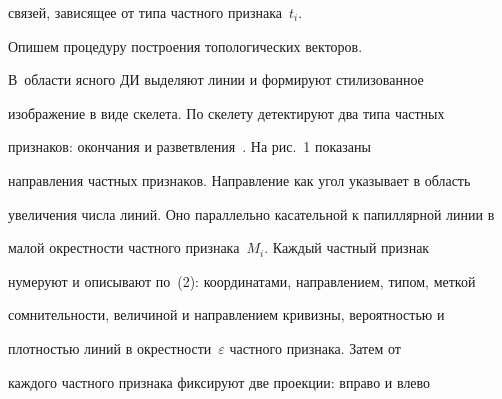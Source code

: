 связей, зависящее от типа частного признака~$t_i$.





  Опишем процедуру построения топологических векторов.


  


  В~области ясного ДИ выделяют линии и формируют стилизованное 


изображение в виде скелета. По скелету детектируют два типа частных 


признаков: окончания и разветвления~\cite{3-ush}. На рис.~1 показаны 


направления частных признаков. Направление как угол указывает в область 


увеличения числа линий. Оно параллельно касательной к папиллярной линии в 


малой окрестности частного признака~$M_i$. Каждый частный признак 


нумеруют и описывают по~(2): координатами, направлением, типом, меткой 


сомнительности, величиной и направлением кривизны, вероятностью и 


плотностью линий в окрестности~$\varepsilon$ частного признака. Затем от 


каждого частного признака фиксируют две проекции: вправо и влево\linebreak\vspace*{-12pt}




